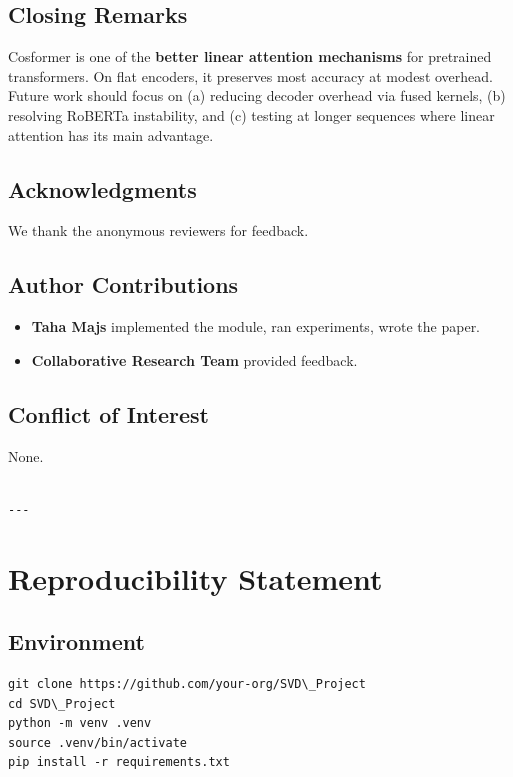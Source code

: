 \subsection{Closing Remarks}

Cosformer is one of the \textbf{better linear attention mechanisms} for 
pretrained transformers. On flat encoders, it preserves most accuracy at 
modest overhead. Future work should focus on (a) reducing decoder overhead 
via fused kernels, (b) resolving RoBERTa instability, and (c) testing at 
longer sequences where linear attention has its main advantage.

\subsection{Acknowledgments}

We thank the anonymous reviewers for feedback.

\subsection{Author Contributions}

\begin{itemize}
\item \textbf{Taha Majs} implemented the module, ran experiments, wrote the paper.
\item \textbf{Collaborative Research Team} provided feedback.

\end{itemize}
\subsection{Conflict of Interest}

None.
\begin{lstlisting}

---
\end{lstlisting}


\section{Reproducibility Statement}

\subsection{Environment}

\begin{lstlisting}
git clone https://github.com/your-org/SVD\_Project
cd SVD\_Project
python -m venv .venv
source .venv/bin/activate
pip install -r requirements.txt
\end{lstlisting}

